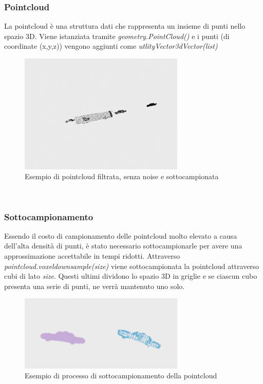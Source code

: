 \documentclass[italian]{article}
\begin{document}
\subsubsection{Pointcloud}
La pointcloud è una struttura dati che rappresenta un insieme di punti nello spazio 3D. Viene istanziata tramite \textit{geometry.PointCloud()} e i punti (di coordinate (x,y,z)) vengono aggiunti come \textit{utlityVector3dVector(list)}\\
\begin{figure}[H]
	\centering
	\includegraphics[width=0.7\textwidth]{Pointcloud}
	\footnotesize
	\caption{Esempio di pointcloud filtrata, senza noise e sottocampionata}
\end{figure}\\
\subsubsection*{Sottocampionamento}
Essendo il costo di campionamento delle pointcloud molto elevato a causa dell'alta densità di punti, è stato necessario sottocampionarle per avere una approssimazione accettabile in tempi ridotti. Attraverso \textit{pointcloud.voxeldownsample(size)}  viene sottocampionata la pointcloud attraverso cubi di lato \textit{size}. Questi ultimi dividono lo spazio 3D in griglie e se ciascun cubo presenta una serie di punti, ne verrà mantenuto uno solo.
\begin{figure}[H]
	\centering
	\includegraphics[width=0.7\textwidth]{Voxel}
	\footnotesize
	\caption{Esempio di processo di sottocampionamento della pointcloud}
\end{figure}
\end{document}
